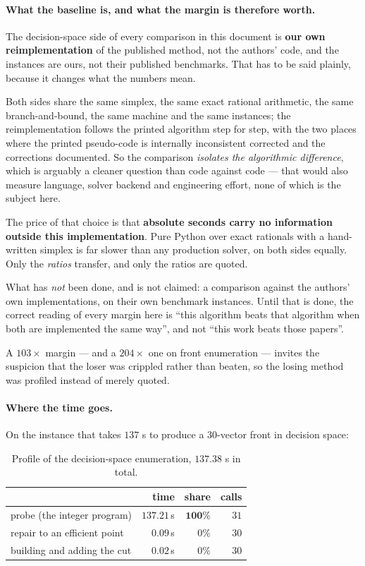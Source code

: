 \documentclass[11pt,a4paper]{article}
\begin{document}
\paragraph{What the baseline is, and what the margin is therefore worth.}
The decision-space side of every comparison in this document is \textbf{our own
reimplementation} of the published method, not the authors' code, and the
instances are ours, not their published benchmarks.  That has to be said
plainly, because it changes what the numbers mean.

Both sides share the same simplex, the same exact rational arithmetic, the same
branch-and-bound, the same machine and the same instances; the reimplementation
follows the printed algorithm step for step, with the two places where the
printed pseudo-code is internally inconsistent corrected and the corrections
documented.  So the comparison \emph{isolates the algorithmic difference},
which is arguably a cleaner question than code against code --- that would also
measure language, solver backend and engineering effort, none of which is the
subject here.

The price of that choice is that \textbf{absolute seconds carry no information
outside this implementation}.  Pure Python over exact rationals with a
hand-written simplex is far slower than any production solver, on both sides
equally.  Only the \emph{ratios} transfer, and only the ratios are quoted.

What has \emph{not} been done, and is not claimed: a comparison against the
authors' own implementations, on their own benchmark instances.  Until that is
done, the correct reading of every margin here is ``this algorithm beats that
algorithm when both are implemented the same way'', and not ``this work beats
those papers''.

A $103\times$ margin --- and a $204\times$ one on front enumeration --- invites
the suspicion that the loser was crippled rather than beaten, so the losing
method was profiled instead of merely quoted.

\paragraph{Where the time goes.}  On the instance that takes $137$ s to produce
a 30-vector front in decision space:

\begin{table}[h]
\centering
\caption{Profile of the decision-space enumeration, $137.38$ s in total.}
\begin{tabular}{lrrr}
\toprule
 & time & share & calls \\
\midrule
probe (the integer program) & $137.21$\,s & $\mathbf{100\%}$ & $31$ \\
repair to an efficient point & $0.09$\,s & $0\%$ & $30$ \\
building and adding the cut & $0.02$\,s & $0\%$ & $30$ \\
\bottomrule
\end{tabular}
\end{table}
\end{document}
